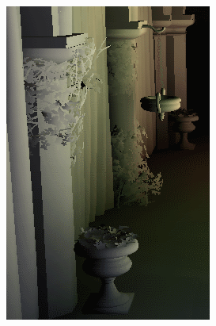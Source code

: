 \begin{figure}[htb]
\begin{subfigure}[b]{0.20\textwidth}
        \includegraphics[width=.95\textwidth]{screenshots/interleaved_without}%
        \caption{}
        \label{fig:results:interleaved_without}%
    \end{subfigure}%
    \begin{subfigure}[b]{0.20\textwidth}
        \centering

\end{subfigure}
\end{figure}
